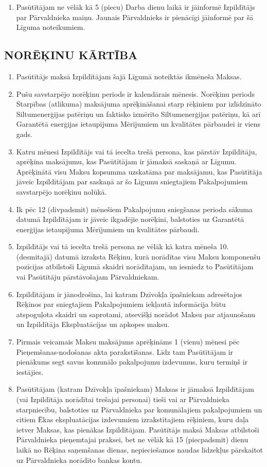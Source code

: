 \begin{multicols}{2}
\begin{enumerate}
	\item Pasūtītājam ne vēlāk kā 5 (piecu) Darba dienu laikā ir jāinformē Izpildītājs par Pārvaldnieka maiņu. Jaunais Pārvaldnieks ir pienācīgi jāinformē par šā Līguma noteikumiem.
\end{enumerate}

\subsection{NORĒĶINU KĀRTĪBA}
\begin{enumerate}
	\item Pasūtītājs maksā Izpildītājam šajā Līgumā noteiktās ikmēneša Maksas.
	\item Pušu savstarpējo norēķinu periods ir kalendārais mēnesis. Norēķinu periods Starpības (atlikuma) maksājuma aprēķināšanai starp rēķiniem par izlīdzināto Siltumenerģijas patēriņu un faktisko izmērīto Siltumenerģijas patēriņu, kā arī Garantētā enerģijas ietaupījuma Mērījumiem un kvalitātes pārbaudei ir viens gads.
	\item Katru mēnesi Izpildītājs vai tā iecelta trešā persona, kas pārstāv Izpildītāju, aprēķina maksājumu, kas Pasūtītājam ir jāmaksā saskaņā ar Līgumu. Aprēķinātā visu Maksu kopsumma uzskatāma par maksājamu, kas Pasūtītāja jāveic Izpildītājam par saskaņā ar šo Līgumu sniegtajiem Pakalpojumiem savstarpējo norēķinu nolūkā.
	\item Ik pēc 12 (divpadsmit) mēnešiem Pakalpojumu sniegšanas perioda sākuma datumā Izpildītājam ir jāveic ikgadējie norēķini, balstoties uz Garantētā enerģijas ietaupījuma Mērījumiem un kvalitātes pārbaudi.
	\item Izpildītājs vai tā iecelta trešā persona ne vēlāk kā katra mēneša 10.  (desmitajā) datumā izraksta Rēķinu, kurā norādītas visu Maksu komponenšu pozīcijas atbilstoši Līgumā skaidri norādītajam, un iesniedz to Pasūtītājam vai Pasūtītāju pārstāvošajam Pārvaldniekam.
	\item Izpildītājam ir jānodrošina, lai katram Dzīvokļa īpašniekam adresētajos Rēķinos par sniegtajiem Pakalpojumiem iekļautā informācija būtu atspoguļota skaidri un saprotami, atsevišķi norādot Maksu par atjaunošanu un Izpildītāja Ekspluatācijas un apkopes maksu.
	\item Pirmais veicamais Maksu maksājums aprēķināms 1 (vienu) mēnesi pēc Pieņemšanas-nodošanas akta parakstīšanas. Līdz tam Pasūtītājam ir pienākums segt savus komunālo pakalpojumu izdevumus, kuru termiņš ir iestājies.
	\item Pasūtītājam (katram Dzīvokļa īpašniekam) Maksas ir jāmaksā Izpildītājam (vai Izpildītāja norādītai trešajai personai) tieši vai ar Pārvaldnieka starpniecību, balstoties uz Pārvaldnieka par komunālajiem pakalpojumiem un citiem Ēkas ekspluatācijas izdevumiem izrakstītajiem rēķiniem, kuru daļa ietver Maksas, kas pienākas Izpildītājam. Pasūtītājs maksā Maksas atbilstoši Pārvaldnieka pieņemtajai praksei, bet ne vēlāk kā 15 (piecpadsmit) dienu laikā no Rēķina saņemšanas dienas, nepieciešamos naudas līdzekļus pārskaitot uz Pārvaldnieka norādīto bankas kontu.

\end{enumerate}
\end{multicols}
